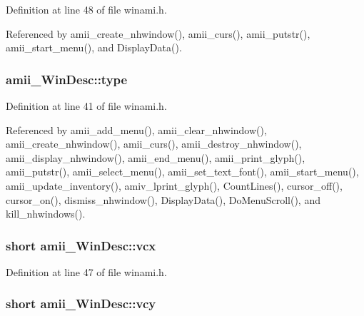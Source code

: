 Definition at line 48 of file winami.\+h.



Referenced by amii\+\_\+create\+\_\+nhwindow(), amii\+\_\+curs(), amii\+\_\+putstr(), amii\+\_\+start\+\_\+menu(), and Display\+Data().

\hypertarget{structamii__WinDesc_ab90130f7f09b474842877b2f71d708e0}{
\subsubsection[{type}]{ amii\+\_\+\+Win\+Desc\+::type}}\label{structamii__WinDesc_ab90130f7f09b474842877b2f71d708e0}


Definition at line 41 of file winami.\+h.



Referenced by amii\+\_\+add\+\_\+menu(), amii\+\_\+clear\+\_\+nhwindow(), amii\+\_\+create\+\_\+nhwindow(), amii\+\_\+curs(), amii\+\_\+destroy\+\_\+nhwindow(), amii\+\_\+display\+\_\+nhwindow(), amii\+\_\+end\+\_\+menu(), amii\+\_\+print\+\_\+glyph(), amii\+\_\+putstr(), amii\+\_\+select\+\_\+menu(), amii\+\_\+set\+\_\+text\+\_\+font(), amii\+\_\+start\+\_\+menu(), amii\+\_\+update\+\_\+inventory(), amiv\+\_\+lprint\+\_\+glyph(), Count\+Lines(), cursor\+\_\+off(), cursor\+\_\+on(), dismiss\+\_\+nhwindow(), Display\+Data(), Do\+Menu\+Scroll(), and kill\+\_\+nhwindows().

\hypertarget{structamii__WinDesc_ac72b8cfb771ed88fd3790664587a3076}{
\subsubsection[{vcx}]{\setlength{\rightskip}{0pt plus 5cm}short amii\+\_\+\+Win\+Desc\+::vcx}}\label{structamii__WinDesc_ac72b8cfb771ed88fd3790664587a3076}


Definition at line 47 of file winami.\+h.

\hypertarget{structamii__WinDesc_a9fb0dc845686391668949b7f47afc912}{
\subsubsection[{vcy}]{\setlength{\rightskip}{0pt plus 5cm}short amii\+\_\+\+Win\+Desc\+::vcy}}\label{structamii__WinDesc_a9fb0dc845686391668949b7f47afc912}



